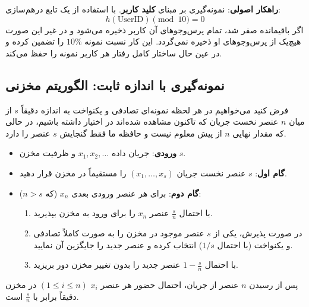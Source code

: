 \textbf{راهکار اصولی}: نمونه‌گیری بر مبنای \textbf{کلید کاربر}. با استفاده از یک تابع درهم‌سازی:
\begin{equation}
h(\text{UserID}) \pmod{10} = 0
\end{equation}
اگر باقیمانده صفر شد، تمام پرس‌وجوهای آن کاربر ذخیره می‌شود و در غیر این صورت هیچ‌یک از پرس‌وجوهای او ذخیره نمی‌گردد. این کار نسبت نمونه $10\%$ را تضمین کرده و در عین حال ساختار کامل رفتار هر کاربر نمونه را حفظ می‌کند.

\subsection{نمونه‌گیری با اندازه ثابت: الگوریتم مخزنی \texorpdfstring{}{(Reservoir Sampling)}}
فرض کنید می‌خواهیم در هر لحظه نمونه‌ای تصادفی و یکنواخت به اندازه دقیقاً $s$ از میان $n$ عنصر نخست جریان که تاکنون مشاهده شده‌اند در اختیار داشته باشیم، در حالی که مقدار نهایی $n$ از پیش معلوم نیست و حافظه ما فقط گنجایش $s$ عنصر را دارد.

\begin{algorithmbox}
\begin{itemize}
    \item \textbf{ورودی}: جریان داده $x_1, x_2, \dots$ و ظرفیت مخزن $s$.
    \item \textbf{گام اول}: $s$ عنصر نخست جریان $(x_1, \dots, x_s)$ را مستقیماً در مخزن قرار دهید.
    \item \textbf{گام دوم}: برای هر عنصر ورودی بعدی $x_n$ (که $n > s$):
    \begin{enumerate}
        \item با احتمال $\frac{s}{n}$ عنصر $x_n$ را برای ورود به مخزن بپذیرید.
        \item در صورت پذیرش، یکی از $s$ عنصر موجود در مخزن را به صورت کاملاً تصادفی و یکنواخت (با احتمال $1/s$) انتخاب کرده و عنصر جدید را جایگزین آن نمایید.
        \item با احتمال $1 - \frac{s}{n}$ عنصر جدید را بدون تغییر مخزن دور بریزید.
    \end{enumerate}
\end{itemize}
\end{algorithmbox}

\begin{theorem}
پس از رسیدن $n$ عنصر از جریان، احتمال حضور هر عنصر $x_i$ $(1 \le i \le n)$ در مخزن دقیقاً برابر با $\frac{s}{n}$ است.
\end{theorem}

